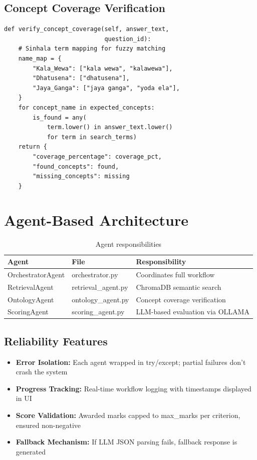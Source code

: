 \documentclass[12pt,a4paper]{article}
\begin{document}
\subsection{Concept Coverage Verification}
\begin{lstlisting}[caption={Ontology concept verification (ontology\_loader.py)}]
def verify_concept_coverage(self, answer_text,
                            question_id):
    # Sinhala term mapping for fuzzy matching
    name_map = {
        "Kala_Wewa": ["kala wewa", "kalawewa"],
        "Dhatusena": ["dhatusena"],
        "Jaya_Ganga": ["jaya ganga", "yoda ela"],
    }
    for concept_name in expected_concepts:
        is_found = any(
            term.lower() in answer_text.lower()
            for term in search_terms)
    return {
        "coverage_percentage": coverage_pct,
        "found_concepts": found,
        "missing_concepts": missing
    }
\end{lstlisting}

\section{Agent-Based Architecture}

\begin{table}[H]
\centering
\begin{tabular}{lll}
\toprule
\textbf{Agent} & \textbf{File} & \textbf{Responsibility} \\
\midrule
OrchestratorAgent & orchestrator.py & Coordinates full workflow \\
RetrievalAgent & retrieval\_agent.py & ChromaDB semantic search \\
OntologyAgent & ontology\_agent.py & Concept coverage verification \\
ScoringAgent & scoring\_agent.py & LLM-based evaluation via OLLAMA \\
\bottomrule
\end{tabular}
\caption{Agent responsibilities}
\end{table}

\subsection{Reliability Features}
\begin{itemize}[leftmargin=*]
  \item \textbf{Error Isolation:} Each agent wrapped in try/except; partial failures don't crash the system
  \item \textbf{Progress Tracking:} Real-time workflow logging with timestamps displayed in UI
  \item \textbf{Score Validation:} Awarded marks capped to max\_marks per criterion, ensured non-negative
  \item \textbf{Fallback Mechanism:} If LLM JSON parsing fails, fallback response is generated
\end{itemize}
\end{document}
